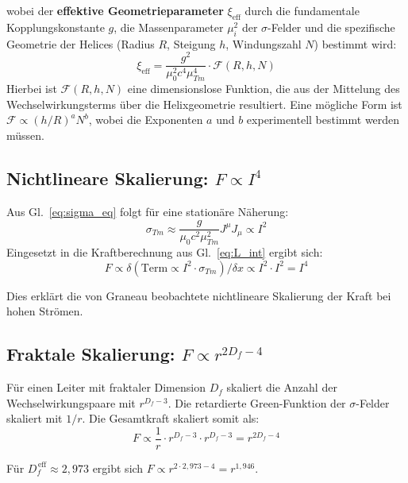 	wobei der \textbf{effektive Geometrieparameter} $\xi_{\text{eff}}$ durch die fundamentale Kopplungskonstante $g$, die Massenparameter $\mu_i^2$ der $\sigma$-Felder und die spezifische Geometrie der Helices (Radius $R$, Steigung $h$, Windungszahl $N$) bestimmt wird:
	\begin{equation}
		\xi_{\text{eff}} = \frac{g^2}{\mu_0^2 c^4 \mu_{Tm}^4} \cdot \mathcal{F}(R, h, N) \label{eq:xi_effective}
	\end{equation}
	Hierbei ist $\mathcal{F}(R, h, N)$ eine dimensionslose Funktion, die aus der Mittelung des Wechselwirkungsterms über die Helixgeometrie resultiert. Eine mögliche Form ist $\mathcal{F} \propto (h/R)^a N^b$, wobei die Exponenten $a$ und $b$ experimentell bestimmt werden müssen.
	
	\subsection{Nichtlineare Skalierung: $F \propto I^4$}
	Aus Gl.~\ref{eq:sigma_eq} folgt für eine stationäre Näherung:
	\begin{equation}
		\sigma_{Tm} \approx \frac{g}{\mu_0 c^2 \mu_{Tm}^2} J^\mu J_\mu \propto I^2
	\end{equation}
	Eingesetzt in die Kraftberechnung aus Gl.~\ref{eq:L_int} ergibt sich:
	\begin{equation}
		F \propto \delta\left(\text{Term} \propto I^2 \cdot \sigma_{Tm}\right)/\delta x \propto I^2 \cdot I^2 = I^4 \label{eq:I4_scaling}
	\end{equation}
	
	Dies erklärt die von Graneau beobachtete nichtlineare Skalierung der Kraft bei hohen Strömen.
	
	\subsection{Fraktale Skalierung: $F \propto r^{2D_f - 4}$}
	Für einen Leiter mit fraktaler Dimension $D_f$ skaliert die Anzahl der Wechselwirkungspaare mit $r^{D_f - 3}$. Die retardierte Green-Funktion der $\sigma$-Felder skaliert mit $1/r$. Die Gesamtkraft skaliert somit als:
	\begin{equation}
		F \propto \frac{1}{r} \cdot r^{D_f - 3} \cdot r^{D_f - 3} = r^{2D_f - 4} \label{eq:fractal_scaling}
	\end{equation}
	
	Für $D_f^{\,\text{eff}} \approx 2{,}973$ ergibt sich $F \propto r^{2 \cdot 2{,}973 - 4} = r^{1{,}946}$.
	
